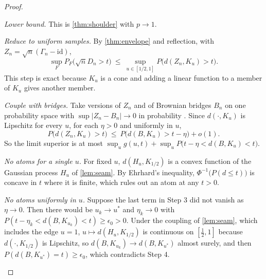 \begin{proof}
\begin{steps}
\item \emph{Lower bound.} This is \cref{thm:shoulder} with $p\to1$.
\item \emph{Reduce to uniform samples.} By \cref{thm:envelope} and reflection, with $Z_n=\sqrt n(\Gamma_n-\mathrm{id})$,
\[
\sup_FP_F\bigl(\sqrt nD_n>t\bigr)\ \le\ \sup_{u\in[1/2,1]}P\bigl(d(Z_n,K_u)>t\bigr).
\]
This step is exact because $K_u$ is a cone and adding a linear function to a member of $K_u$ gives another member.
\item \emph{Couple with bridges.} Take versions of $Z_n$ and of Brownian bridges $B_n$ on one probability space with $\sup|Z_n-B_n|\to0$ in probability \cite{KMT75}. Since $d(\cdot,K_u)$ is Lipschitz for every $u$, for each $\eta>0$ and uniformly in $u$,
\[
P\bigl(d(Z_n,K_u)>t\bigr)\ \le\ P\bigl(d(B,K_u)>t-\eta\bigr)+o(1).
\]
So the limit superior is at most $\sup_ug(u,t)+\sup_uP\bigl(t-\eta<d(B,K_u)<t\bigr)$.
\item \emph{No atoms for a single $u$.} For fixed $u$, $d(H_u,K_{1/2})$ is a convex function of the Gaussian process $H_u$ of \cref{lem:seam}. By Ehrhard's inequality, $\Phi^{-1}\bigl(P(d\le t)\bigr)$ is concave in $t$ where it is finite, which rules out an atom at any $t>0$.
\item \emph{No atoms uniformly in $u$.} Suppose the last term in Step 3 did not vanish as $\eta\to0$. Then there would be $u_k\to u^*$ and $\eta_k\to0$ with $P(t-\eta_k<d(B,K_{u_k})<t)\ge\epsilon_0>0$. Under the coupling of \cref{lem:seam}, which includes the edge $u=1$, $u\mapsto d(H_u,K_{1/2})$ is continuous on $[\frac12,1]$ because $d(\cdot,K_{1/2})$ is Lipschitz, so $d(B,K_{u_k})\to d(B,K_{u^*})$ almost surely, and then $P(d(B,K_{u^*})=t)\ge\epsilon_0$, which contradicts Step 4.\qedhere
\end{steps}
\end{proof}
